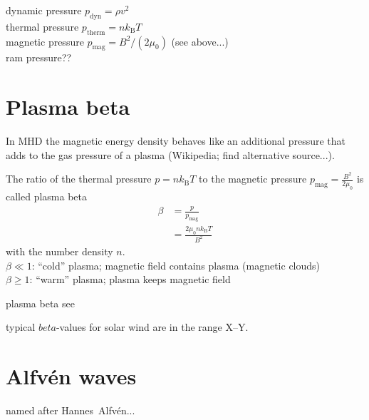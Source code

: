 dynamic pressure $p_\text{dyn} = \rho v^2$\\
thermal pressure $p_\text{therm} = n k_\text{B} T$\\
magnetic pressure $p_\text{mag} = B^2 / (2 \mu_0)$ (see above...)\\
ram pressure??\\


\section{Plasma beta}
\label{sec:plasma_beta}
In MHD the magnetic energy density behaves like an additional pressure that adds to the gas pressure of a plasma (Wikipedia; find alternative source...).

The ratio of the thermal pressure $p = n k_\text{B} T$ to the magnetic pressure $p_\text{mag} = \frac{B^2}{2 \mu_0}$ is called plasma beta
\begin{align}
	\beta &= \frac{p}{p_\text{mag}}\\
	&= \frac{2 \mu_0 n k_\text{B} T}{B^2}
\end{align}
with the number density $n$.\\
$\beta \ll 1$: ``cold'' plasma; magnetic field contains plasma (magnetic clouds)\\
$\beta \geq 1$: ``warm'' plasma; plasma keeps magnetic field

plasma beta see \citep[p.~50]{Kivelson1995}

typical $beta$-values for solar wind are in the range X--Y.\\



\section{Alfvén waves}	%
\label{sec:alfvén_waves}

named after Hannes~Alfvén...

